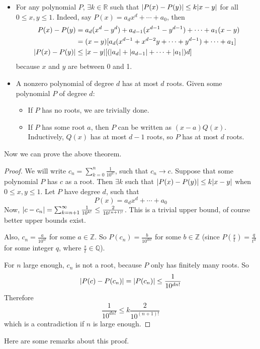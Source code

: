 \documentclass{article}
\begin{document}
	\begin{itemize}
		\item For any polynomial $P$, $\exists k \in \mathbb R$ such that $\abs{P(x) - P(y)} \leq k\abs{x-y}$ for all $0 \leq x, y \leq 1$. Indeed, say $P(x) = a_dx^d + \cdots + a_0$, then
		\begin{align*}
			P(x) - P(y) &= a_d(x^d - y^d) + a_{d-1}(x^{d-1} - y^{d-1}) + \cdots + a_1(x-y) \\
			&= (x-y) [ a_d(x^{d-1} + x^{d-2}y + \cdots + y^{d-1}) + \cdots + a_1 ] \\
			\abs{P(x) - P(y)} &\leq \abs{x-y} [ (\abs{a_d} + \abs{a_{d-1}} + \cdots + \abs{a_1})d ]
		\end{align*}
		because $x$ and $y$ are between 0 and 1.
		\item A nonzero polynomial of degree $d$ has at most $d$ roots. Given some polynomial $P$ of degree $d$:
		\begin{itemize}
			\item If $P$ has no roots, we are trivially done.
			\item If $P$ has some root $a$, then $P$ can be written as $(x-a)Q(x)$. Inductively, $Q(x)$ has at most $d-1$ roots, so $P$ has at most $d$ roots.
		\end{itemize}
	\end{itemize}
	Now we can prove the above theorem.
	\begin{proof}
		We will write $c_n = \sum_{k=0}^n \frac{1}{10^{k!}}$, such that $c_n \to c$. Suppose that some polynomial $P$ has $c$ as a root. Then $\exists k$ such that $\abs{P(x) - P(y)} \leq k\abs{x-y}$ when $0 \leq x, y \leq 1$. Let $P$ have degree $d$, such that
		\[ P(x) = a_dx^d + \cdots + a_0 \]
		Now, $\abs{c - c_n} = \sum_{k=n+1}^\infty \frac{1}{10^{k!}} \leq \frac{2}{10^{(n+1)!}}$. This is a trivial upper bound, of course better upper bounds exist.

		Also, $c_n = \frac{a}{10^{n!}}$ for some $a \in \mathbb Z$. So $P(c_n) = \frac{b}{10^{dn!}}$ for some $b \in \mathbb Z$ (since $P(\frac{s}{t}) = \frac{q}{t^d}$ for some integer $q$, where $\frac{s}{t} \in \mathbb Q$).

		For $n$ large enough, $c_n$ is not a root, because $P$ only has finitely many roots. So
		\[ \abs{P(c) - P(c_n)} = \abs{P(c_n)} \leq \frac{1}{10^{dn!}} \]
		Therefore
		\[ \frac{1}{10^{dn!}} \leq k\frac{2}{10^{(n+1)!}} \]
		which is a contradiction if $n$ is large enough.
	\end{proof}
	Here are some remarks about this proof.
\end{document}
